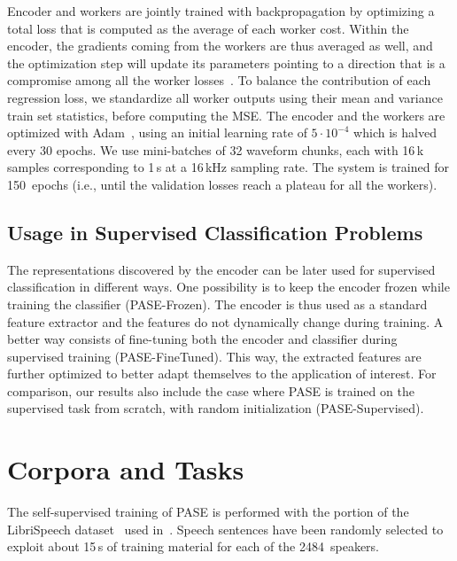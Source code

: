 \documentclass[a4paper]{article}
\begin{document}
Encoder and workers are jointly trained with backpropagation by optimizing a total loss that is computed as the average of each worker cost.
Within the encoder, the gradients coming from the workers are thus averaged as well, and the optimization step will update its parameters pointing to a direction that is a compromise among all the worker losses~\cite{Serra18AIRD}.
To balance the contribution of each regression loss, we standardize all worker outputs using their mean and variance train set statistics, before computing the MSE.
The encoder and the workers are optimized with Adam~\cite{adam}, using an initial learning rate of $5\cdot 10^{-4}$ which is halved every 30 epochs. We use mini-batches of 32 waveform chunks, each with 16\,k samples corresponding to 1\,s at a 16\,kHz sampling rate. The system is trained for 150~epochs (i.e., until the validation losses reach a plateau for all the workers). 

\subsection{Usage in Supervised Classification Problems}
\label{sec:exp_setup_classif}

The representations discovered by the encoder can be later used for supervised classification in different ways. One possibility is to keep the encoder frozen while training the classifier (PASE-Frozen). The encoder is thus used as a standard feature extractor and the features do not dynamically change during training. A better way consists of fine-tuning both the encoder and classifier during supervised training (PASE-FineTuned). This way, the extracted features are further optimized to better adapt themselves to the application of interest. 
For comparison, our results also include the case where PASE is trained on the supervised task from scratch, with random initialization (PASE-Supervised).

\section{Corpora and Tasks}
\label{sec:exp_setup_corpora}

The self-supervised training of PASE is performed with the portion of the LibriSpeech dataset~\cite{librispeech} used in~\cite{ravanelli2018learning}. 
Speech sentences have been randomly selected to exploit about 15\,s of training material for each of the 2484~speakers. 
\end{document}
